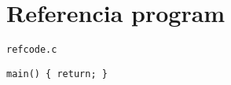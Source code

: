 \section{Referencia program}
\texttt{refcode.c}
\begin{lstlisting}[frame=single,float=!ht,caption=A referencia programkódja,label=listing:refprog]
main() { return; }
\end{lstlisting}
